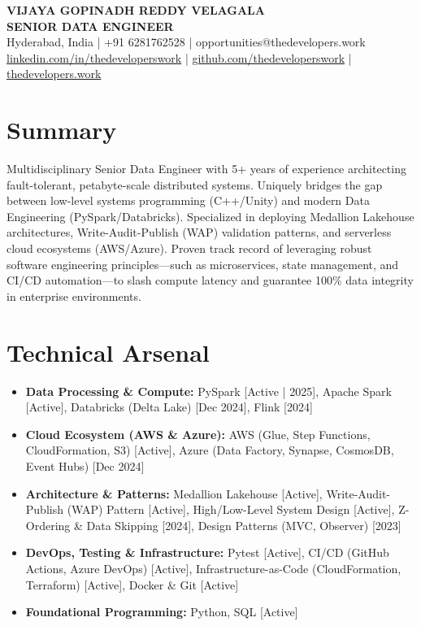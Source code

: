 \documentclass[10pt, letterpaper]{article}
\begin{document}
\begin{center}
    {\Huge \textbf{VIJAYA GOPINADH REDDY VELAGALA}} \\ \vspace{2pt}
    \textbf{SENIOR DATA ENGINEER} \\ \vspace{4pt}
    Hyderabad, India | +91 6281762528 | opportunities@thedevelopers.work \\ \vspace{2pt}
    \href{https://linkedin.com/in/thedeveloperswork}{linkedin.com/in/thedeveloperswork} | \href{https://github.com/thedeveloperswork}{github.com/thedeveloperswork} | \href{https://thedevelopers.work}{thedevelopers.work}
\end{center}

\section{Summary}
\noindent Multidisciplinary Senior Data Engineer with 5+ years of experience architecting fault-tolerant, petabyte-scale distributed systems. Uniquely bridges the gap between low-level systems programming (C++/Unity) and modern Data Engineering (PySpark/Databricks). Specialized in deploying Medallion Lakehouse architectures, Write-Audit-Publish (WAP) validation patterns, and serverless cloud ecosystems (AWS/Azure). Proven track record of leveraging robust software engineering principles—such as microservices, state management, and CI/CD automation—to slash compute latency and guarantee 100\% data integrity in enterprise environments.

\section{Technical Arsenal}
\begin{itemize}[leftmargin=0.15in, label={}]
    \item \textbf{Data Processing \& Compute:} PySpark [Active | 2025], Apache Spark [Active], Databricks (Delta Lake) [Dec 2024], Flink [2024]
    \item \textbf{Cloud Ecosystem (AWS \& Azure):} AWS (Glue, Step Functions, CloudFormation, S3) [Active], Azure (Data Factory, Synapse, CosmosDB, Event Hubs) [Dec 2024]
    \item \textbf{Architecture \& Patterns:} Medallion Lakehouse [Active], Write-Audit-Publish (WAP) Pattern [Active], High/Low-Level System Design [Active], Z-Ordering \& Data Skipping [2024], Design Patterns (MVC, Observer) [2023]
    \item \textbf{DevOps, Testing \& Infrastructure:} Pytest [Active], CI/CD (GitHub Actions, Azure DevOps) [Active], Infrastructure-as-Code (CloudFormation, Terraform) [Active], Docker \& Git [Active]
    \item \textbf{Foundational Programming:} Python, SQL [Active]
\end{itemize}
\end{document}
